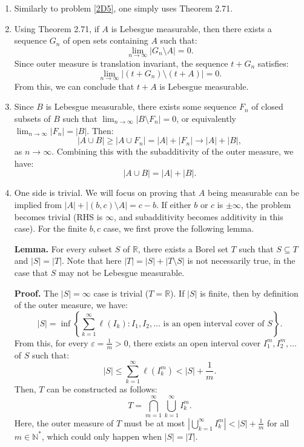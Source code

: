 \begin{enumerate}[label=\textbf{2D.\arabic*}]
\item Similarly to problem \ref{2D5}, one simply uses Theorem 2.71.
\item Using Theorem 2.71, if \( A \) is Lebesgue measurable, then there exists
  a sequence \( G_{n} \) of open sets containing \( A \) such that:
  \[
    \lim_{n \to \infty} |G_{n} \setminus A| = 0
  .\]
  Since outer measure is translation invariant, the sequence \( t + G_{n} \)
  satisfies:
  \[
    \lim_{n \to \infty} |(t + G_{n}) \setminus (t + A)| = 0
  .\] 
  From this, we can conclude that \( t + A \) is Lebesgue measurable.
\item Since \( B \) is Lebesgue measurable, there exists some sequence \( F_{n}
  \) of closed subsets of \( B \) such that \( \lim_{n \to \infty} |B \setminus
  F_{n}| = 0\), or equivalently \( \lim_{n \to \infty} |F_{n}| = |B| \). Then:
  \[
    |A \cup B| \ge |A \cup F_{n}| = |A| + |F_{n}| \to |A| + |B|
  ,\] as \( n \to \infty \). Combining this with the subadditivity of the outer
  measure, we have:
  \[
    |A \cup B| = |A| + |B|
  .\] 
\item \label{2D12}
  One side is trivial. We will focus on proving that \( A \) being
  measurable can be implied from \( |A|+|(b,c) \setminus A| = c - b \). If
  either \( b \) or \( c \) is \( \pm \infty \), the problem becomes trivial
  (RHS is \( \infty \), and subadditivity becomes additivity in this case). For
  the finite \( b, c \) case, we first prove the following lemma.

  \textbf{Lemma.} For every subset \( S \) of \( \mathbb{R} \), there exists a
  Borel set \( T \) such that \( S \subseteq T \) and \( |S| = |T| \). Note that
  here \( |T| = |S| + |T \setminus S| \) is not necessarily true, in the case
  that \( S \) may not be Lebesgue measurable.

  \textbf{Proof.}
  The \( |S| = \infty \) case is trivial (\( T = \mathbb{R} \)). If \( |S| \) is
  finite, then by definition of the outer measure, we have:
  \[
    |S| = \inf \left\{ \sum_{k = 1}^{\infty} \ell(I_{k}): I_{1},I_{2},\ldots
    \text{ is an open interval cover of } S \right\}  
  .\] 
  From this, for every \( \varepsilon = \frac{1}{m} > 0 \), there exists an open
  interval cover \( I^{m}_{1}, I_{2}^{m}, \ldots  \) of \( S \) such that:
  \[
    |S| \le \sum_{k = 1}^{\infty} \ell(I_{k}^{m}) < |S| + \frac{1}{m}
  .\] 
  Then, \( T \) can be constructed as follows:
  \[
    T = \bigcap_{m = 1}^{\infty} \bigcup_{k = 1}^{\infty} I^{m}_{k}
  .\] 
  Here, the outer measure of \( T \) must be at most \( |\bigcup_{k =
  1}^{\infty} I^{m}_{k}| < |S| + \frac{1}{m} \) for all \( m \in \mathbb{N}^{*}
  \), which could only happen when \( |S| = |T| \).


\end{enumerate}
